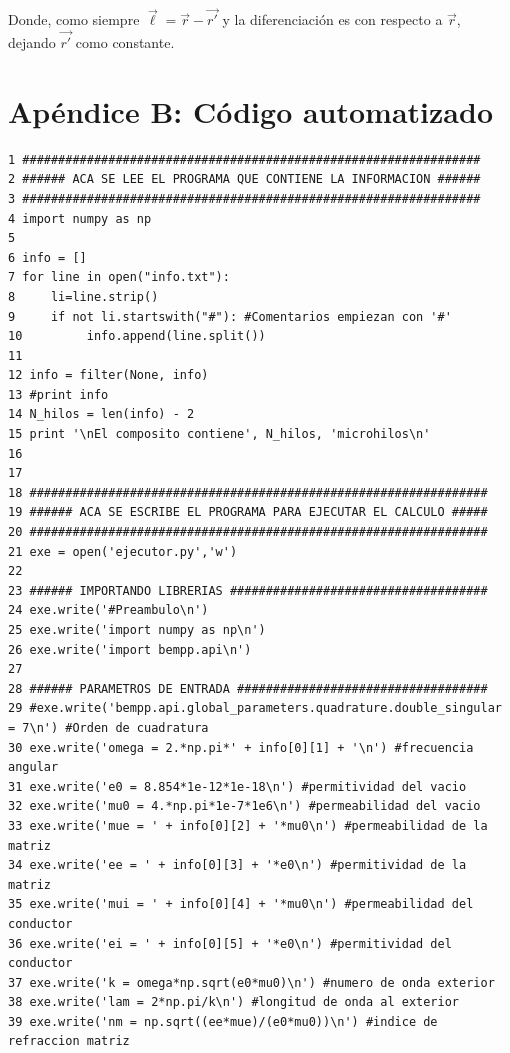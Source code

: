 \documentclass[12pt,letterpaper]{article}
\numberwithin{equation}{section}
\begin{document}
\noindent Donde, como siempre $\vec{\ell}=\vec{r}-\vec{r'}$ y la diferenciación es con respecto a $\vec{r}$, dejando $\vec{r'}$ como constante.

\pagebreak
\part*{Apéndice B: Código automatizado}
\setcounter{figure}{0}
\begin{lstlisting}
1 ################################################################
2 ###### ACA SE LEE EL PROGRAMA QUE CONTIENE LA INFORMACION ######
3 ################################################################
4 import numpy as np
5 
6 info = []
7 for line in open("info.txt"):
8     li=line.strip()
9     if not li.startswith("#"): #Comentarios empiezan con '#'
10         info.append(line.split())
11 
12 info = filter(None, info)
13 #print info
14 N_hilos = len(info) - 2
15 print '\nEl composito contiene', N_hilos, 'microhilos\n'
16 
17 
18 ################################################################
19 ###### ACA SE ESCRIBE EL PROGRAMA PARA EJECUTAR EL CALCULO #####
20 ################################################################
21 exe = open('ejecutor.py','w')
22 
23 ###### IMPORTANDO LIBRERIAS ####################################
24 exe.write('#Preambulo\n')
25 exe.write('import numpy as np\n')
26 exe.write('import bempp.api\n')
27 
28 ###### PARAMETROS DE ENTRADA ###################################
29 #exe.write('bempp.api.global_parameters.quadrature.double_singular = 7\n') #Orden de cuadratura
30 exe.write('omega = 2.*np.pi*' + info[0][1] + '\n') #frecuencia angular
31 exe.write('e0 = 8.854*1e-12*1e-18\n') #permitividad del vacio
32 exe.write('mu0 = 4.*np.pi*1e-7*1e6\n') #permeabilidad del vacio
33 exe.write('mue = ' + info[0][2] + '*mu0\n') #permeabilidad de la matriz
34 exe.write('ee = ' + info[0][3] + '*e0\n') #permitividad de la matriz
35 exe.write('mui = ' + info[0][4] + '*mu0\n') #permeabilidad del conductor
36 exe.write('ei = ' + info[0][5] + '*e0\n') #permitividad del conductor
37 exe.write('k = omega*np.sqrt(e0*mu0)\n') #numero de onda exterior
38 exe.write('lam = 2*np.pi/k\n') #longitud de onda al exterior
39 exe.write('nm = np.sqrt((ee*mue)/(e0*mu0))\n') #indice de refraccion matriz

\end{lstlisting}
\end{document}
